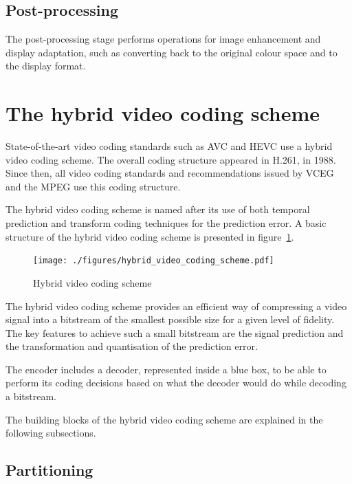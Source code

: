 \documentclass[11pt,a4paper,openright,twoside]{book}
\numberwithin{equation}{section} %
\numberwithin{figure}{section} %
\numberwithin{table}{section} %
\begin{document}
\subsection{Post-processing}
\label{sub:post_processing}

The post-processing stage performs operations for image enhancement and
display adaptation, such as converting back to the original colour
space and to the display format.

\section{The hybrid video coding scheme}
\label{sec:the_hybrid_video_coding_scheme}

State-of-the-art video coding standards such as \acs{AVC} and \acs{HEVC} use a
hybrid video coding scheme.
The overall coding structure appeared in H.261, in 1988.
Since then, all video coding standards and recommendations issued by
\acs{VCEG} and the \acs{MPEG} use this coding structure.

The hybrid video coding scheme is named after its use of both temporal
prediction and transform coding techniques for the prediction error.
A basic structure of the hybrid video coding scheme is presented in
figure~\ref{fig:hybrid_video_coding_scheme}.

\begin{figure}[tb]
	\centering
	\texttt{[image: ./figures/hybrid\_video\_coding\_scheme.pdf]}
	\caption{Hybrid video coding scheme}
	\label{fig:hybrid_video_coding_scheme}
\end{figure}

The hybrid video coding scheme provides an efficient way of compressing
a video signal into a bitstream of the smallest possible size for a given
level of fidelity.
The key features to achieve such a small bitstream are the signal
prediction and the transformation and quantisation of the prediction error.

The encoder includes a decoder, represented inside a blue box, to be
able to perform its coding decisions based on what the decoder would do
while decoding a bitstream.

The building blocks of the hybrid video coding scheme are explained in
the following subsections.

\subsection{Partitioning}
\label{sub:partitioning}
\end{document}
